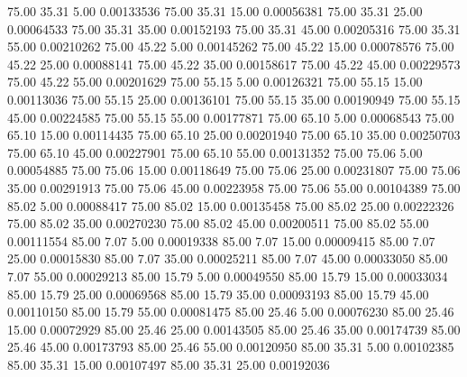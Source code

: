      75.00     35.31      5.00     0.00133536
     75.00     35.31     15.00     0.00056381
     75.00     35.31     25.00     0.00064533
     75.00     35.31     35.00     0.00152193
     75.00     35.31     45.00     0.00205316
     75.00     35.31     55.00     0.00210262
     75.00     45.22      5.00     0.00145262
     75.00     45.22     15.00     0.00078576
     75.00     45.22     25.00     0.00088141
     75.00     45.22     35.00     0.00158617
     75.00     45.22     45.00     0.00229573
     75.00     45.22     55.00     0.00201629
     75.00     55.15      5.00     0.00126321
     75.00     55.15     15.00     0.00113036
     75.00     55.15     25.00     0.00136101
     75.00     55.15     35.00     0.00190949
     75.00     55.15     45.00     0.00224585
     75.00     55.15     55.00     0.00177871
     75.00     65.10      5.00     0.00068543
     75.00     65.10     15.00     0.00114435
     75.00     65.10     25.00     0.00201940
     75.00     65.10     35.00     0.00250703
     75.00     65.10     45.00     0.00227901
     75.00     65.10     55.00     0.00131352
     75.00     75.06      5.00     0.00054885
     75.00     75.06     15.00     0.00118649
     75.00     75.06     25.00     0.00231807
     75.00     75.06     35.00     0.00291913
     75.00     75.06     45.00     0.00223958
     75.00     75.06     55.00     0.00104389
     75.00     85.02      5.00     0.00088417
     75.00     85.02     15.00     0.00135458
     75.00     85.02     25.00     0.00222326
     75.00     85.02     35.00     0.00270230
     75.00     85.02     45.00     0.00200511
     75.00     85.02     55.00     0.00111554
     85.00      7.07      5.00     0.00019338
     85.00      7.07     15.00     0.00009415
     85.00      7.07     25.00     0.00015830
     85.00      7.07     35.00     0.00025211
     85.00      7.07     45.00     0.00033050
     85.00      7.07     55.00     0.00029213
     85.00     15.79      5.00     0.00049550
     85.00     15.79     15.00     0.00033034
     85.00     15.79     25.00     0.00069568
     85.00     15.79     35.00     0.00093193
     85.00     15.79     45.00     0.00110150
     85.00     15.79     55.00     0.00081475
     85.00     25.46      5.00     0.00076230
     85.00     25.46     15.00     0.00072929
     85.00     25.46     25.00     0.00143505
     85.00     25.46     35.00     0.00174739
     85.00     25.46     45.00     0.00173793
     85.00     25.46     55.00     0.00120950
     85.00     35.31      5.00     0.00102385
     85.00     35.31     15.00     0.00107497
     85.00     35.31     25.00     0.00192036
